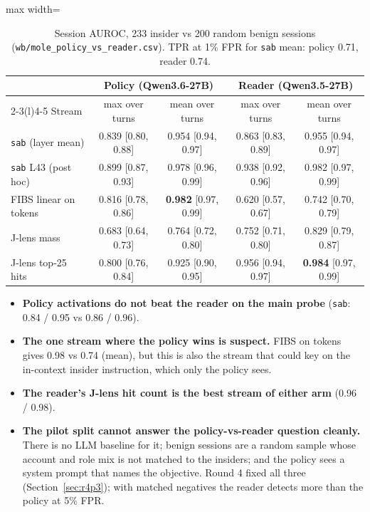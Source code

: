 \documentclass[11pt]{article}
\begin{document}
\begin{table}[!htbp]\centering\small
\begin{adjustbox}{max width=\linewidth}\begin{tabular}{@{}lcccc@{}}
\toprule
& \multicolumn{2}{c}{Policy (Qwen3.6-27B)} & \multicolumn{2}{c}{Reader (Qwen3.5-27B)}\\
\cmidrule(lr){2-3}\cmidrule(l){4-5}
Stream & max over turns & mean over turns & max over turns & mean over turns\\
\midrule
\texttt{sab} (layer mean) & 0.839 [0.80, 0.88] & 0.954 [0.94, 0.97] & 0.863 [0.83, 0.89] & 0.955 [0.94, 0.97]\\
\texttt{sab} L43 (post hoc) & 0.899 [0.87, 0.93] & 0.978 [0.96, 0.99] & 0.938 [0.92, 0.96] & 0.982 [0.97, 0.99]\\
FIBS linear on tokens & 0.816 [0.78, 0.86] & \textbf{0.982} [0.97, 0.99] & 0.620 [0.57, 0.67] & 0.742 [0.70, 0.79]\\
J-lens mass & 0.683 [0.64, 0.73] & 0.764 [0.72, 0.80] & 0.752 [0.71, 0.80] & 0.829 [0.79, 0.87]\\
J-lens top-25 hits & 0.800 [0.76, 0.84] & 0.925 [0.90, 0.95] & 0.956 [0.94, 0.97] & \textbf{0.984} [0.97, 0.99]\\
\bottomrule
\end{tabular}\end{adjustbox}
\caption{Session AUROC, 233 insider vs 200 random benign sessions (\nolinkurl{wb/mole_policy_vs_reader.csv}). TPR at 1\% FPR for \texttt{sab} mean: policy 0.71, reader 0.74.}
\end{table}


\begin{itemize}
\item \textbf{Policy activations do not beat the reader on the main probe} (\texttt{sab}: 0.84 / 0.95 vs 0.86 / 0.96).
\item \textbf{The one stream where the policy wins is suspect.} FIBS on tokens gives 0.98 vs 0.74 (mean), but this is also the stream that could key on the in-context insider instruction, which only the policy sees.
\item \textbf{The reader's J-lens hit count is the best stream of either arm} (0.96 / 0.98).
\item \textbf{The pilot split cannot answer the policy-vs-reader question cleanly.} There is no LLM baseline for it; benign sessions are a random sample whose account and role mix is not matched to the insiders; and the policy sees a system prompt that names the objective. Round 4 fixed all three (Section~\ref{sec:r4p3}); with matched negatives the reader detects more than the policy at 5\% FPR.
\end{itemize}
\end{document}
